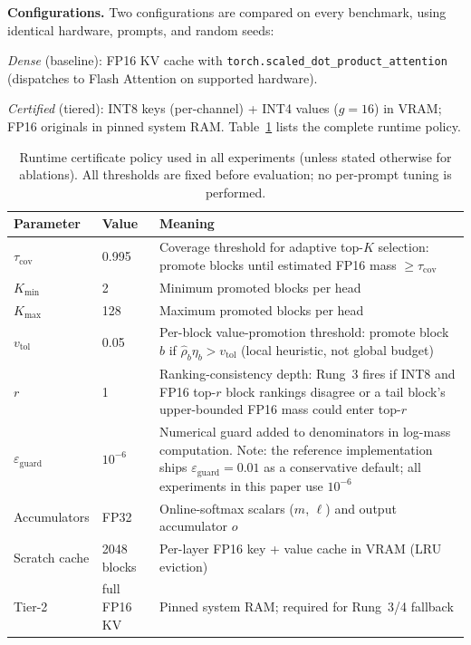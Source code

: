 \documentclass[10pt,twocolumn,a4paper]{article}
\theoremstyle{definition}
\theoremstyle{remark}
\newcommand{\torchsdpa}{\texttt{torch.scaled\_\hspace{0pt}dot\_\hspace{0pt}product\_\hspace{0pt}attention}}
\begin{document}
\textbf{Configurations.}  Two configurations are compared on every benchmark, using identical hardware, prompts, and random seeds:

\emph{Dense} (baseline): FP16 KV cache with \torchsdpa{} (dispatches to Flash Attention on supported hardware).

\emph{Certified} (tiered): INT8 keys (per-channel) + INT4 values ($g{=}16$) in VRAM; FP16 originals in pinned system RAM.  Table~\ref{tab:policy} lists the complete runtime policy.

\begin{table}[!t]
\centering
\caption{Runtime certificate policy used in all experiments (unless stated otherwise for ablations).  All thresholds are fixed before evaluation; no per-prompt tuning is performed.}
\label{tab:policy}
\small
\begin{tabular}{llp{10cm}}
\toprule
\textbf{Parameter} & \textbf{Value} & \textbf{Meaning} \\
\midrule
$\tau_{\mathrm{cov}}$ & 0.995 & Coverage threshold for adaptive top-$K$ selection: promote blocks until estimated FP16 mass $\geq \tau_{\mathrm{cov}}$ \\
$K_{\min}$ & 2 & Minimum promoted blocks per head \\
$K_{\max}$ & 128 & Maximum promoted blocks per head \\
$v_{\mathrm{tol}}$ & 0.05 & Per-block value-promotion threshold: promote block $b$ if $\hat{\rho}_b \eta_b > v_{\mathrm{tol}}$ (local heuristic, not global budget) \\
$r$ & 1 & Ranking-consistency depth: Rung~3 fires if INT8 and FP16 top-$r$ block rankings disagree or a tail block's upper-bounded FP16 mass could enter top-$r$ \\
$\varepsilon_{\mathrm{guard}}$ & $10^{-6}$ & Numerical guard added to denominators in log-mass computation.  Note: the reference implementation ships $\varepsilon_{\mathrm{guard}}{=}0.01$ as a conservative default; all experiments in this paper use $10^{-6}$ \\
Accumulators & FP32 & Online-softmax scalars ($m$, $\ell$) and output accumulator $o$ \\
Scratch cache & 2048 blocks & Per-layer FP16 key + value cache in VRAM (LRU eviction) \\
Tier-2 & full FP16 KV & Pinned system RAM; required for Rung~3/4 fallback \\
\bottomrule
\end{tabular}
\end{table}
\end{document}
